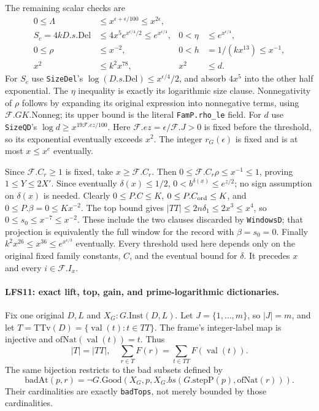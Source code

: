 The remaining scalar checks are
\begin{align*}
 0\le\Lambda&\le x^{\epsilon+\epsilon/100}\le x^{2\epsilon},\\
 S_c=4kD.s.\mathrm{Del}
 &\le4x^5e^{x^{\epsilon/4}/2}\le e^{x^{\epsilon/4}},
 &0<\eta&\le e^{x^{\epsilon/4}},\\
 0\le\rho&\le x^{-2},
 &0<h&=1/(kx^{13})\le x^{-1},\\
 x^2&\le k^2x^{78},
 &x^2&\le d.                                                \tag{LFS.25}
\end{align*}
For $S_c$ use \texttt{SizeDel}'s
$\log(D.s.\mathrm{Del})\le x^{\epsilon/4}/2$, and absorb
$4x^5$ into the other half exponential.  The $\eta$ inequality
is exactly its logarithmic size clause.  Nonnegativity of
$\rho$ follows by expanding its original expression into
nonnegative terms, using $\mathcal F.GK.\mathrm{Nonneg}$;
its upper bound is the literal \texttt{FamP.rho\_le} field.
For $d$ use \texttt{SizeQD}'s
$\log d\ge x^{19\mathcal F.ez/100}$.
Here $\mathcal F.ez=\epsilon/\mathcal F.J>0$ is fixed before
the threshold, so its exponential eventually exceeds $x^2$.
The integer $r_G(\epsilon)$ is fixed and is at most $x\le x^e$
eventually.

Since $\mathcal F.C_r\ge1$ is fixed, take $x\ge\mathcal F.C_r$.
Then $0\le\mathcal F.C_r\rho\le x^{-1}\le1$, proving
$1\le Y\le2X'$.  Since eventually $\delta(x)\le1/2$,
$0<b^{\delta(x)}\le e^{z/2}$; no sign assumption on
$\delta(x)$ is needed.  Clearly $0\le P.C\le K$,
$0\le P.C_{\rm ord}\le K$, and $0\le P.\beta=0\le Kx^{-2}$.
The top bound gives $|TT|\le2n\delta_1\le2x^3\le x^4$,
so $0\le s_0\le x^{-7}\le x^{-2}$.  These include the two
clauses discarded by \texttt{WindowsD}; that projection is
equivalently the full window for the record with
$\beta=s_0=0$.
Finally $k^2x^{26}\le x^{36}\le e^{x^{\epsilon/3}}$ eventually.
Every threshold used here depends only on the original fixed
family constants, $C$, and the eventual bound for $\delta$.
It precedes $x$ and every $i\in\mathcal F.I_x$.

\paragraph{LFS11: exact lift, top, gain, and prime-logarithmic dictionaries.}
\label{claim:LFS11}
Fix one original $D,L$ and $X_G:G.\mathrm{Inst}(D,L)$.
Let $J=\{1,\ldots,m\}$, so $|J|=m$, and let
$T=\mathrm{TTv}(D)=\{\operatorname{val}(t):t\in TT\}$.
The frame's integer-label map is injective and
$\mathrm{ofNat}(\operatorname{val}(t))=t$.  Thus
\[
 |T|=|TT|,\quad
 \sum_{r\in T}F(r)=\sum_{t\in TT}F(\operatorname{val}(t)).     \tag{LFS.26}
\]
The same bijection restricts to the bad subsets defined by
\[
 \mathrm{badAt}(p,r)=\neg G.\mathrm{Good}
 (X_G,p,X_G.bs(G.\mathrm{stepP}(p),\mathrm{ofNat}(r))).
\]
Their cardinalities are exactly \texttt{badTops}, not merely
bounded by those cardinalities.

